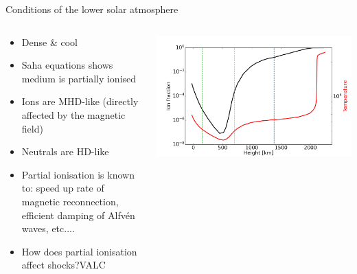 \documentclass[10pt,aspectratio=169,usenames,dvipsnames]{beamer}
\begin{document}
\begin{frame}{Conditions of the lower solar atmosphere}
\begin{columns}
\begin{column}{0.5\textwidth}
\begin{itemize}
    \item Dense \& cool
    \item Saha equations shows medium is partially ionised
    \item Ions are MHD-like (directly affected by the magnetic field)
    \item Neutrals are HD-like 
    \item Partial ionisation is known to: speed up rate of magnetic reconnection, efficient damping of Alfv\'en waves, etc....
    \item How does partial ionisation affect shocks?VALC
\end{itemize}
\end{column}
\begin{column}{0.5\textwidth}
\includegraphics[width=0.95\linewidth]{2023ECRW/Figures/saha2_plot.png}
\end{column}
\end{columns}
\end{frame}
\end{document}
